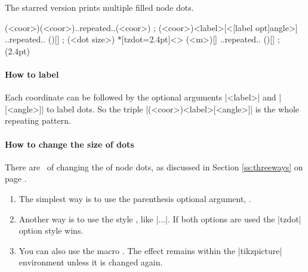 The starred version \icmd{\tzdots*} prints multiple filled node dots.

\begin{tzdef}{}
\tzdots*(<coor>)(<coor>)..repeated..(<coor>) ;
 (<coor>){<label>}[<[label opt]angle>]
                                 ..repeated.. (){}[] ; (<dot size>)
 *[tzdot=2.4pt]<> (<m>){}[] ..repeated.. (){}[] ; (2.4pt)
\end{tzdef}

\begin{tzcode}{.3}
\end{tzcode}

\paragraph{How to label}

Each coordinate can be followed by the optional arguments |{<label>}| and |[<angle>]| to label dots. So the triple |(<coor>){<label>}[<angle>]| is the whole repeating pattern.

\begin{tzcode}{.3}
\end{tzcode}


\paragraph{How to change the size of dots}

There are \threeways\ of changing the  of node dots, as discussed in Section \ref{ss:threeways} on page \pageref{ss:threeways}.

\begin{enumerate}
\item The simplest way is to use the  parenthesis optional argument, .
\item Another way is to use the style , like |\tzdots[tzdot=3pt]...|.
If both options are used the |tzdot| option style wins.
\item You can also use the macro \icmd{\settzdotsize}.
The effect remains within the |tikzpicture| environment unless it is changed again.
\end{enumerate}


